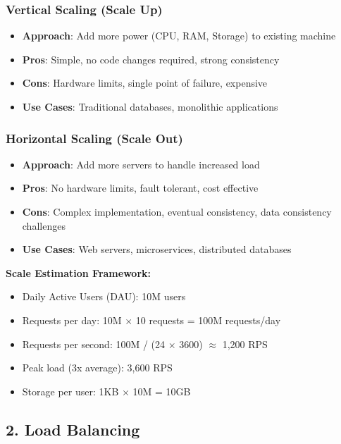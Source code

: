 \documentclass[10pt,a4paper]{article}
\begin{document}
\subsubsection{Vertical Scaling (Scale Up)}
\begin{itemize}
\item \textbf{Approach}: Add more power (CPU, RAM, Storage) to existing machine
\item \textbf{Pros}: Simple, no code changes required, strong consistency
\item \textbf{Cons}: Hardware limits, single point of failure, expensive
\item \textbf{Use Cases}: Traditional databases, monolithic applications
\end{itemize}

\subsubsection{Horizontal Scaling (Scale Out)}
\begin{itemize}
\item \textbf{Approach}: Add more servers to handle increased load
\item \textbf{Pros}: No hardware limits, fault tolerant, cost effective
\item \textbf{Cons}: Complex implementation, eventual consistency, data consistency challenges
\item \textbf{Use Cases}: Web servers, microservices, distributed databases
\end{itemize}

\begin{scaleBox}
\textbf{Scale Estimation Framework:}
\begin{itemize}
\item Daily Active Users (DAU): 10M users
\item Requests per day: 10M $\times$ 10 requests = 100M requests/day
\item Requests per second: 100M / (24 $\times$ 3600) $\approx$ 1,200 RPS
\item Peak load (3x average): 3,600 RPS
\item Storage per user: 1KB $\times$ 10M = 10GB
\end{itemize}
\end{scaleBox}

\subsection{2. Load Balancing}
\end{document}
